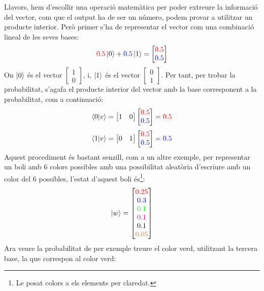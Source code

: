 Llavors, hem d'escollir una operació matemàtica per poder extreure la informació del vector, com que el output ha de ser un número, podem provar a utilitzar un producte interior. Però primer s'ha de representar el vector com una combinació lineal de les seves bases:
$$
\textcolor{red}{0.5}\ket{0} + \textcolor{blue}{0.5}\ket{1} = \begin{bmatrix}
	\textcolor{red}{0.5} \\
	\textcolor{blue}{0.5}
\end{bmatrix}
$$
On $\ket{0}$ és el vector $\begin{bmatrix} 1 \\ 0\end{bmatrix}$, i, $\ket{1}$ és el vector $\begin{bmatrix} 0 \\ 1 \end{bmatrix}$.
Per tant, per trobar la probabilitat, s'agafa el producte interior del vector amb la base corresponent a la probabilitat, com a continuació:
$$
\bra{0}\ket{v} =
\begin{bmatrix}
	1 &
	0
\end{bmatrix}
\begin{bmatrix}
	\textcolor{red}{0.5} \\
	\textcolor{blue}{0.5}
\end{bmatrix}
= \textcolor{red}{0.5}
$$
$$
\bra{1}\ket{v} =
	\begin{bmatrix}
		0 &
		1
	\end{bmatrix}
	\begin{bmatrix}
		\textcolor{red}{0.5} \\
		\textcolor{blue}{0.5}
	\end{bmatrix}
	= \textcolor{blue}{0.5}
$$
Aquest procediment és bastant senzill, com a un altre exemple, per representar un boli amb 6 colors possibles amb una possibilitat aleatòria d'escriure amb un color del 6 possibles, l'estat d'aquest boli és\footnote{Le posat colors a els elements per claredat.}:
$$
\ket{w} =
\begin{bmatrix}
	\textcolor{red}{0.25} \\
	\textcolor{blue}{0.3 }\\
	\textcolor{green}{0.1 }\\
	\textcolor{magenta}{0.1 }\\
	\textcolor{black}{0.1 }\\
	\textcolor{brown}{0.05}
\end{bmatrix}
$$
Ara veure la probabilitat de per exemple treure el color verd, utilitzant la tercera base, la que correspon al color verd:
